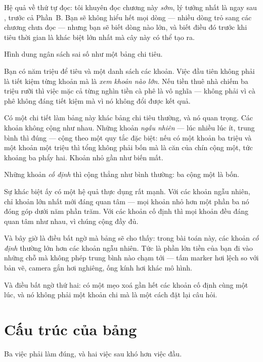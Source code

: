 \documentclass[../../marker.tex]{subfiles}
\begin{document}
Hệ quả về thứ tự đọc: tôi khuyên đọc chương này \emph{sớm}, lý tưởng nhất là ngay sau , trước cả Phần~B. Bạn sẽ không hiểu hết mọi dòng --- nhiều dòng trỏ sang các chương chưa đọc --- nhưng bạn sẽ biết dòng nào lớn, và biết điều đó trước khi tiêu thời gian là khác biệt lớn nhất mà cây này có thể tạo ra.

\begin{trucgiac}
Hình dung ngân sách sai số như một bảng chi tiêu.

Bạn có năm triệu để tiêu và một danh sách các khoản. Việc đầu tiên không phải là tiết kiệm từng khoản mà là \emph{xem khoản nào lớn}. Nếu tiền thuê nhà chiếm ba triệu rưỡi thì việc mặc cả từng nghìn tiền cà phê là vô nghĩa --- không phải vì cà phê không đáng tiết kiệm mà vì nó không đổi được kết quả.

Có một chi tiết làm bảng này khác bảng chi tiêu thường, và nó quan trọng. Các khoản không cộng như nhau. Những khoản \emph{ngẫu nhiên} --- lúc nhiều lúc ít, trung bình thì đúng --- cộng theo một quy tắc đặc biệt: nếu có một khoản ba triệu và một khoản một triệu thì tổng không phải bốn mà là căn của chín cộng một, tức khoảng ba phẩy hai. Khoản nhỏ gần như biến mất.

Những khoản \emph{cố định} thì cộng thẳng như bình thường: ba cộng một là bốn.

Sự khác biệt ấy có một hệ quả thực dụng rất mạnh. Với các khoản ngẫu nhiên, chỉ khoản lớn nhất mới đáng quan tâm --- mọi khoản nhỏ hơn một phần ba nó đóng góp dưới năm phần trăm. Với các khoản cố định thì mọi khoản đều đáng quan tâm như nhau, vì chúng cộng đầy đủ.

Và bây giờ là điều bất ngờ mà bảng sẽ cho thấy: trong bài toán này, các khoản \emph{cố định} thường lớn hơn các khoản ngẫu nhiên. Tức là phần lớn tiền của bạn đi vào những chỗ mà không phép trung bình nào chạm tới --- tấm marker hơi lệch so với bản vẽ, camera gắn hơi nghiêng, ống kính hơi khác mô hình.

Và điều bất ngờ thứ hai: có một mẹo xoá gần hết các khoản cố định cùng một lúc, và nó không phải một khoản chi mà là một cách đặt lại câu hỏi.
\end{trucgiac}

\section{Cấu trúc của bảng}

Ba việc phải làm đúng, và hai việc sau khó hơn việc đầu.
\end{document}
